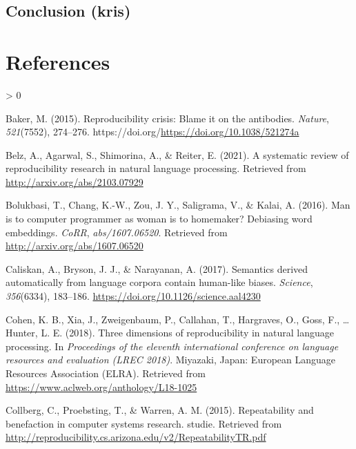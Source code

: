 \documentclass[
  english,
  man,floatsintext]{apa6}
\newlength{\cslhangindent}
\newenvironment{CSLReferences}[2] %
 {%
  \setlength{\parindent}{0pt}
  \ifodd #1 \everypar{\setlength{\hangindent}{\cslhangindent}}\ignorespaces\fi
  \ifnum #2 > 0
  \setlength{\parskip}{#2\baselineskip}
  \fi
 }%
 {}
\begin{document}
\hypertarget{conclusion-kris}{%
\subsection{Conclusion (kris)}\label{conclusion-kris}}

\newpage

\hypertarget{references}{%
\section{References}\label{references}}

\begingroup
\setlength{\parindent}{-0.5in}
\setlength{\leftskip}{0.5in}

\hypertarget{refs}{}
\begin{CSLReferences}{1}{0}
\leavevmode\hypertarget{ref-baker_2015}{}%
Baker, M. (2015). Reproducibility crisis: Blame it on the antibodies. \emph{Nature}, \emph{521}(7552), 274--276. https://doi.org/\url{https://doi.org/10.1038/521274a}

\leavevmode\hypertarget{ref-belz_2021}{}%
Belz, A., Agarwal, S., Shimorina, A., \& Reiter, E. (2021). A systematic review of reproducibility research in natural language processing. Retrieved from \url{http://arxiv.org/abs/2103.07929}

\leavevmode\hypertarget{ref-bolukbasi_2016}{}%
Bolukbasi, T., Chang, K.-W., Zou, J. Y., Saligrama, V., \& Kalai, A. (2016). Man is to computer programmer as woman is to homemaker? Debiasing word embeddings. \emph{CoRR}, \emph{abs/1607.06520}. Retrieved from \url{http://arxiv.org/abs/1607.06520}

\leavevmode\hypertarget{ref-caliskan_2017}{}%
Caliskan, A., Bryson, J. J., \& Narayanan, A. (2017). Semantics derived automatically from language corpora contain human-like biases. \emph{Science}, \emph{356}(6334), 183--186. \url{https://doi.org/10.1126/science.aal4230}

\leavevmode\hypertarget{ref-cohen_2018}{}%
Cohen, K. B., Xia, J., Zweigenbaum, P., Callahan, T., Hargraves, O., Goss, F., \ldots{} Hunter, L. E. (2018). Three dimensions of reproducibility in natural language processing. In \emph{Proceedings of the eleventh international conference on language resources and evaluation ({LREC} 2018)}. Miyazaki, Japan: European Language Resources Association (ELRA). Retrieved from \url{https://www.aclweb.org/anthology/L18-1025}

\leavevmode\hypertarget{ref-collberg_2015}{}%
Collberg, C., Proebsting, T., \& Warren, A. M. (2015). Repeatability and benefaction in computer systems research. studie. Retrieved from \url{http://reproducibility.cs.arizona.edu/v2/RepeatabilityTR.pdf}


\end{CSLReferences}
\end{document}
